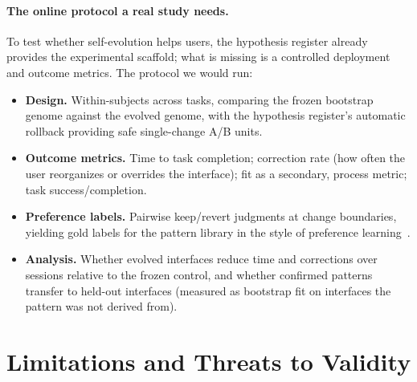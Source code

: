 \documentclass[11pt]{article}
\begin{document}
\paragraph{The online protocol a real study needs.}
To test whether self-evolution helps users, the hypothesis register already
provides the experimental scaffold; what is missing is a controlled deployment
and outcome metrics. The protocol we would run:
\begin{itemize}[leftmargin=1.4em,itemsep=1pt]
  \item \textbf{Design.} Within-subjects across tasks, comparing the frozen
  bootstrap genome against the evolved genome, with the hypothesis register's
  automatic rollback providing safe single-change A/B units.
  \item \textbf{Outcome metrics.} Time to task completion; correction rate (how
  often the user reorganizes or overrides the interface); fit as a secondary,
  process metric; task success/completion.
  \item \textbf{Preference labels.} Pairwise keep/revert judgments at change
  boundaries, yielding gold labels for the pattern library in the style of
  preference learning~\cite{christiano2017preferences}.
  \item \textbf{Analysis.} Whether evolved interfaces reduce time and corrections
  over sessions relative to the frozen control, and whether confirmed patterns
  transfer to held-out interfaces (measured as bootstrap fit on interfaces the
  pattern was not derived from).
\end{itemize}

\section{Limitations and Threats to Validity}
\label{sec:limits}
\end{document}
